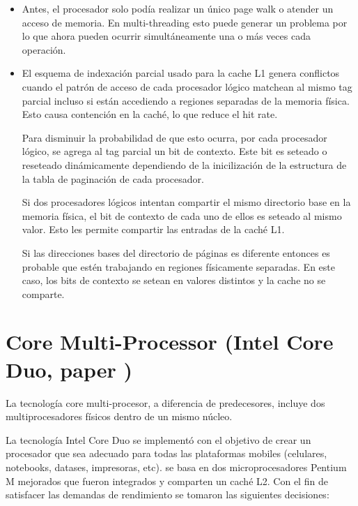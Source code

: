 \begin{itemize}
	\item Antes, el procesador solo podía realizar un único page walk o atender un acceso de memoria. En multi-threading esto puede generar un problema por lo que ahora pueden ocurrir simultáneamente una o más veces cada operación.
	\item El esquema de indexación parcial usado para la cache L1 genera conflictos cuando el patrón de acceso de cada procesador lógico matchean al mismo tag parcial incluso si están accediendo a regiones separadas de la memoria física. Esto causa contención en la caché, lo que reduce el hit rate.
	
	Para disminuir la probabilidad de que esto ocurra, por cada procesador lógico, se agrega al tag parcial un bit de contexto. Este bit es seteado o reseteado dinámicamente dependiendo de la inicilización de la estructura de la tabla de paginación de cada procesador. 
	
	Si dos procesadores lógicos intentan compartir el mismo directorio base en la memoria física, el bit de contexto de cada uno de ellos es seteado al mismo valor. Esto les permite compartir las entradas de la caché L1.
	
	Si las direcciones bases del directorio de páginas es diferente entonces es probable que estén trabajando en regiones físicamente separadas. En este caso, los bits de contexto se setean en valores distintos y la cache no se comparte.
\end{itemize}

\section{Core Multi-Processor (Intel Core Duo, paper \cite{gochman2006ICD})}
La tecnología core multi-procesor, a diferencia de predecesores, incluye dos multiprocesadores físicos dentro de un mismo núcleo. 

La tecnología Intel Core Duo se implementó con el objetivo de crear un procesador que sea adecuado para todas las plataformas mobiles (celulares, notebooks, datases, impresoras, etc). se basa en dos microprocesadores Pentium M mejorados que fueron integrados y comparten un caché L2. Con el fin de satisfacer las demandas de rendimiento se tomaron las siguientes decisiones:

